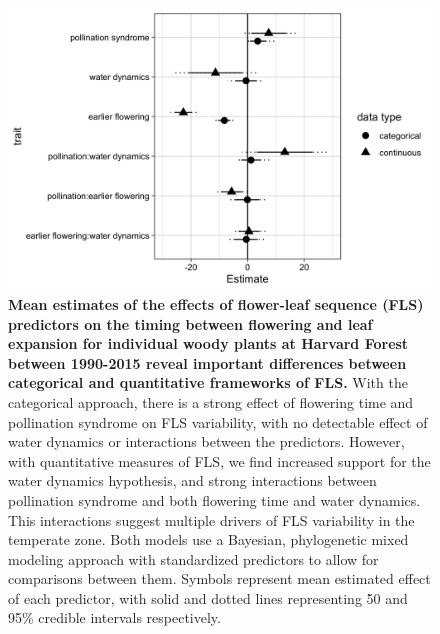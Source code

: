 \documentclass[11pt]{article}
\begin{document}
 \begin{figure}[h!]
        \centering
          \includegraphics[width=\textwidth]{..//HF.jpeg}
          \caption{\textbf{Mean estimates of the effects of flower-leaf sequence (FLS) predictors on the timing between flowering and leaf expansion for individual woody plants at Harvard Forest between 1990-2015 reveal important differences between categorical and quantitative frameworks of FLS.}  With the categorical approach, there is a strong effect of flowering time and pollination syndrome on FLS variability, with no detectable effect of water dynamics or interactions between the predictors. However, with quantitative measures of FLS, we find increased support for the water dynamics hypothesis, and strong interactions between pollination syndrome and both flowering time and water dynamics. This interactions suggest multiple drivers of FLS variability in the temperate zone.  Both models use a Bayesian, phylogenetic mixed modeling approach with standardized predictors to allow for comparisons between them. Symbols represent mean estimated effect of each predictor, with solid and dotted lines representing 50 and 95\% credible intervals respectively.}  
        \label{fig:muplots.HF}
    \end{figure}    

    
\end{document}
